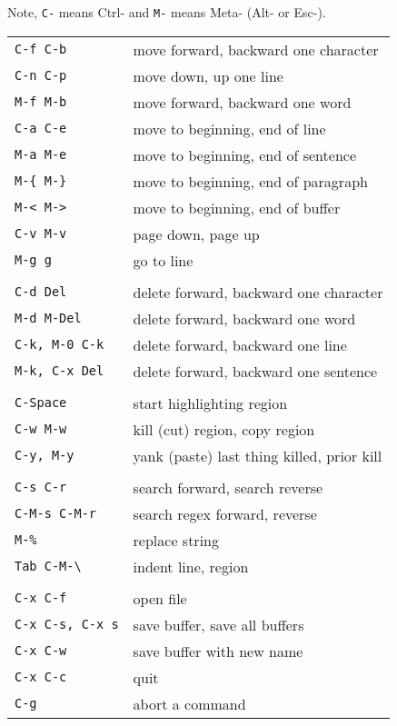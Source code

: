 \documentclass[10pt,twoside,openright]{memoir}
\begin{document}
{\footnotesize
Note, \texttt{C-} means Ctrl- and \texttt{M-} means Meta- (Alt- or Esc-).

\vskip 0.2in
\begin{tabular}{ll}
\texttt{C-f C-b} & move forward, backward one character \\
\texttt{C-n C-p} & move down, up one line \\
\texttt{M-f M-b} & move forward, backward one word \\
\texttt{C-a C-e} & move to beginning, end of line \\
\texttt{M-a M-e} & move to beginning, end of sentence \\
\texttt{M-\{ M-\}} & move to beginning, end of paragraph \\
\texttt{M-< M->} & move to beginning, end of buffer \\
\texttt{C-v M-v} & page down, page up \\
\texttt{M-g g} & go to line \\
& \\
\texttt{C-d Del} & delete forward, backward one character \\
\texttt{M-d M-Del} & delete forward, backward one word \\
\texttt{C-k, M-0 C-k} & delete forward, backward one line \\
\texttt{M-k, C-x Del} & delete forward, backward one sentence \\
& \\
\texttt{C-Space} & start highlighting region \\
\texttt{C-w M-w} & kill (cut) region, copy region \\
\texttt{C-y, M-y} & yank (paste) last thing killed, prior kill \\
& \\
\texttt{C-s C-r} & search forward, search reverse \\
\texttt{C-M-s C-M-r} & search regex forward, reverse \\
\texttt{M-\%} & replace string \\
\texttt{Tab C-M-\textbackslash} & indent line, region \\
& \\
\texttt{C-x C-f} & open file \\
\texttt{C-x C-s, C-x s} & save buffer, save all buffers \\
\texttt{C-x C-w} & save buffer with new name \\
\texttt{C-x C-c} & quit \\
\texttt{C-g} & abort a command \\

\end{tabular}}
\end{document}
